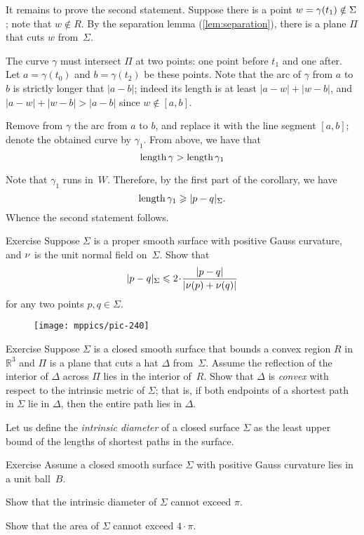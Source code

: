 It remains to prove the second statement.
Suppose there is a point $w\z=\gamma(t_1)\notin\Sigma$;
note that $w\notin R$.
By the separation lemma (\ref{lem:separation}), there is a plane $\Pi$ that cuts $w$ from~$\Sigma$.

The curve $\gamma$ must intersect $\Pi$ at two points: one point before $t_1$ and one after.
Let $a=\gamma(t_0)$ and $b=\gamma(t_2)$ be these points.
Note that the arc of $\gamma$ from $a$ to $b$ is strictly longer that $|a-b|$;
indeed its length is at least $|a-w|+|w-b|$, and $|a-w|+|w-b|>|a-b|$ since $w\notin[a,b]$.

Remove from $\gamma$ the arc from $a$ to $b$, and replace it with the line segment $[a,b]$;
denote the obtained curve by $\gamma_1$. 
From above, we have that
\[\mathop{\rm length}\nolimits\gamma>\mathop{\rm length}\nolimits \gamma_1\]

Note that $\gamma_1$ runs in~$W$.
Therefore, by the first part of the corollary, we have
\[\length \gamma_1\ge \dist{p}{q}\Sigma.\]
Whence the second statement follows.
\qeds

\begin{thm}{Exercise}\label{ex:length-dist-conv}
Suppose $\Sigma$ is a proper smooth surface with positive Gauss curvature, and $\nu$ is the unit normal field on~$\Sigma$.
Show that 
\[\dist{p}{q}\Sigma\le 2\cdot \frac{|p-q|}{|\Norm(p)+\Norm(q)|}\]
for any two points $p,q\in \Sigma$.

\end{thm}


\begin{wrapfigure}{r}{27 mm}
\vskip-10mm
\centering
\texttt{[image: mppics/pic-240]}
\end{wrapfigure}

\begin{thm}{Exercise}\label{ex:hat-convex}
Suppose $\Sigma$ is a closed smooth surface that bounds a convex region $R$ 
in $\mathbb{R}^3$
and $\Pi$ is a plane that cuts a hat $\Delta$ from~$\Sigma$.
Assume the reflection of the interior of $\Delta$ across $\Pi$ lies in the interior of~$R$.
Show that $\Delta$ is \emph{convex} with respect to the intrinsic metric  of $\Sigma$;
that is, 
if both endpoints of a shortest path in $\Sigma$ 
lie in $\Delta$,
then the entire path lies in $\Delta$.
\end{thm}


Let us define the \emph{intrinsic diameter} of a closed surface $\Sigma$ as the least upper bound of the lengths of shortest paths in the surface.

\begin{thm}{Exercise}\label{ex:intrinsic-diameter}
Assume a closed smooth surface $\Sigma$ with positive Gauss curvature lies in a unit ball~$B$.

\begin{subthm}{} Show that the intrinsic diameter of $\Sigma$ cannot exceed $\pi$.
\end{subthm}

\begin{subthm}{}
Show that the area of $\Sigma$ cannot exceed $4\cdot \pi$.
\end{subthm}

\end{thm}
